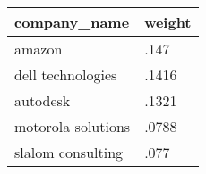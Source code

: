 \documentclass{article}
\begin{document}
\begin{table}[tbp] \centering
{}

\begin{tabularx}{\linewidth}{@{}lC@{}}

\toprule
{company\_name}&{weight} \tabularnewline
\midrule \addlinespace[\belowrulesep]
amazon&.147 \tabularnewline
dell technologies&.1416 \tabularnewline
autodesk&.1321 \tabularnewline
motorola solutions&.0788 \tabularnewline
slalom consulting&.077 \tabularnewline
\bottomrule 

\end{tabularx}
\end{table}
\end{document}
